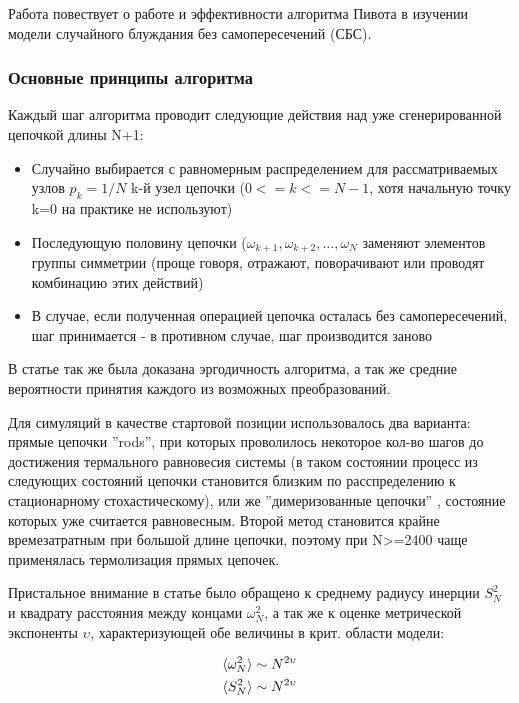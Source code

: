 Работа \cite{madras1988pivot} повествует о работе и эффективности алгоритма Пивота в изучении модели случайного блуждания без самопересечений (СБС).

\subsubsection{Основные принципы алгоритма}

Каждый шаг алгоритма проводит следующие действия над уже сгенерированной цепочкой длины N+1:

\begin{itemize}
    \item Случайно выбирается с равномерным распределением для рассматриваемых узлов $p_{k} = 1/N$ k-й узел цепочки ($0 <= k <= N-1$, хотя начальную точку k=0 на практике не используют)
    \item Последующую половину цепочки ($\omega_{k+1}, \omega_{k+2},\dots,\omega_{N}$ заменяют элементов группы симметрии (проще говоря, отражают, поворачивают или проводят комбинацию этих действий)
    \item В случае, если полученная операцией цепочка осталась без самопересечений, шаг принимается - в противном случае, шаг производится заново
\end{itemize}

В статье так же была доказана эргодичность алгоритма, а так же средние вероятности принятия каждого из возможных преобразований.

Для симуляций в качестве стартовой позиции использовалось два варианта: прямые цепочки ''rods'', при которых проволилось некоторое кол-во шагов до достижения термального равновесия системы (в таком состоянии процесс из следующих состояний цепочки становится близким по расспределению к стационарному стохастическому), или же ''димеризованные цепочки'' , состояние которых уже считается равновесным. Второй метод становится крайне времезатратным при большой длине цепочки, поэтому при N>=2400 чаще применялась термолизация прямых цепочек.

Пристальное внимание в статье было обращено к среднему радиусу инерции $S^{2}_{N}$ и квадрату расстояния между концами $\omega^{2}_{N}$, а так же к оценке метрической экспоненты $\upsilon$, характеризующей обе величины в крит. области модели: 

\begin{align*}
    \langle \omega^{2}_{N} \rangle &\sim N^{2\upsilon} \\
    \langle S^{2}_{N} \rangle &\sim N^{2\upsilon} 
\end{align*}

